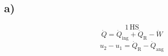 

\subsection*{a)}
\[
1 \, \text{HS}
\]
\[
\dot{Q} = \dot{Q}_{\text{ing}} + \dot{Q}_{\text{R}} - \dot{W}
\]
\[
u_2 - u_1 = \dot{Q}_{\text{R}} - \dot{Q}_{\text{ang}}
\]